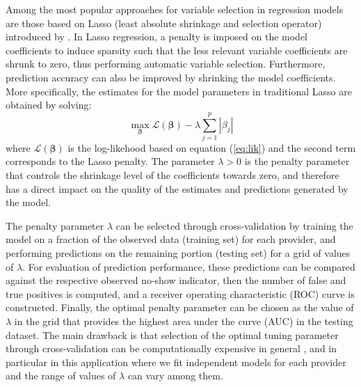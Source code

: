 \documentclass[twoside,11pt]{article}
\newcommand{\bbeta}{\boldsymbol{\beta}}
\begin{document}
Among the most popular approaches for variable selection in regression models are those based on Lasso (least absolute shrinkage and selection operator) introduced by \cite{Tibshirani96}. In Lasso regression, a  penalty is imposed on the model coefficients to induce sparsity such that the less relevant variable coefficients are shrunk to zero, thus performing automatic variable selection. Furthermore, prediction accuracy can also be improved by shrinking the model coefficients. More specifically, the estimates for the model parameters in traditional Lasso are obtained by solving:
\begin{equation} \label{eq:lasso}
\max_{\bbeta}  \mathcal{L}(\bbeta) - \lambda \sum_{j=1}^p|\beta_j|
\end{equation}
where $ \mathcal{L}(\bbeta)$ is the log-likehood based on equation (\ref{eq:lik}) and the second term corresponds to the Lasso penalty. The parameter $\lambda > 0$ is the penalty parameter that controls the shrinkage level of the coefficients towards zero, and therefore has a direct impact on the quality of the estimates and predictions generated by the model. 

The penalty parameter $\lambda$ can be selected through cross-validation by training the model on a fraction of the observed data (training set) for each provider, and performing predictions on the remaining portion (testing set) for a grid of values of $\lambda$. For evaluation of prediction performance, these predictions can be compared against the respective observed no-show indicator, then the number of false and true positives is computed, and a receiver operating characteristic (ROC) curve is constructed. Finally, the optimal penalty parameter can be chosen as the value of $\lambda$ in the grid that provides the highest area under the curve (AUC) in the testing dataset. The main drawback is that selection of the optimal tuning parameter through cross-validation can be computationally expensive in general \citep{Tibshi05}, and in particular in this application where we fit independent models for each provider and the range of values of $\lambda$ can vary among them. 
\end{document}
